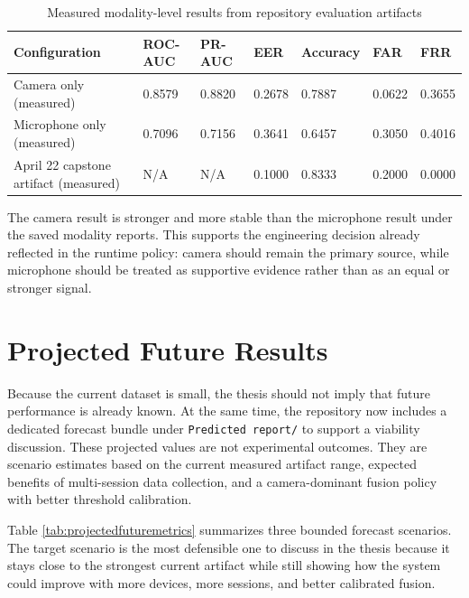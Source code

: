 \documentclass[12pt]{report}
\begin{document}
\begin{table}[H]
\centering
\caption{Measured modality-level results from repository evaluation artifacts}
\label{tab:measuredmodalitymetrics}
\renewcommand{\arraystretch}{1.25}
\begin{tabular}{p{}p{}p{}p{}p{}p{}p{}}
\toprule
\textbf{Configuration} & \textbf{ROC-AUC} & \textbf{PR-AUC} & \textbf{EER} & \textbf{Accuracy} & \textbf{FAR} & \textbf{FRR} \\
\midrule
Camera only (measured) & 0.8579 & 0.8820 & 0.2678 & 0.7887 & 0.0622 & 0.3655 \\
Microphone only (measured) & 0.7096 & 0.7156 & 0.3641 & 0.6457 & 0.3050 & 0.4016 \\
April 22 capstone artifact (measured) & N/A & N/A & 0.1000 & 0.8333 & 0.2000 & 0.0000 \\
\bottomrule
\end{tabular}
\end{table}

The camera result is stronger and more stable than the microphone result under the saved modality reports. This supports the engineering decision already reflected in the runtime policy: camera should remain the primary source, while microphone should be treated as supportive evidence rather than as an equal or stronger signal.

\section{Projected Future Results}

Because the current dataset is small, the thesis should not imply that future performance is already known. At the same time, the repository now includes a dedicated forecast bundle under \texttt{Predicted report/} to support a viability discussion. These projected values are not experimental outcomes. They are scenario estimates based on the current measured artifact range, expected benefits of multi-session data collection, and a camera-dominant fusion policy with better threshold calibration.

Table \ref{tab:projectedfuturemetrics} summarizes three bounded forecast scenarios. The target scenario is the most defensible one to discuss in the thesis because it stays close to the strongest current artifact while still showing how the system could improve with more devices, more sessions, and better calibrated fusion.
\end{document}
